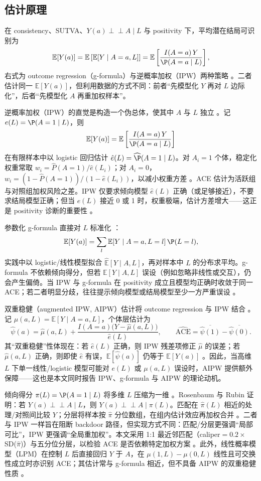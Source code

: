 \documentclass[12pt,a4paper]{article}
\newcommand{\E}{\mathbb{E}}
\newcommand{\indep}{\perp\!\!\!\perp}
\begin{document}
\subsection{估计原理}

在 consistency、SUTVA、$Y(a)\indep A\mid L$ 与 positivity 下，平均潜在结局可识别为
\[
\E[Y(a)]=\E\left[\E[Y\mid A=a,L]\right]=\E\left[\frac{I(A=a)\,Y}{\P(A=a\mid L)}\right],
\]
右式为 outcome regression（g-formula）与逆概率加权（IPW）两种策略 \cite{hernan2024whatif}。二者估计同一 $\E[Y(a)]$，但利用数据的方式不同：前者“先模型化 $Y$ 再对 $L$ 边际化”，后者“先模型化 $A$ 再重加权样本”。

逆概率加权（IPW）的直觉是构造一个伪总体，使其中 $A$ 与 $L$ 独立 \cite{chen2024iptw}。记 $e(L)=\P(A=1\mid L)$，则
\[
\E[Y(a)]=\E\left[\frac{I(A=a)\,Y}{\P(A=a\mid L)}\right]
\]
在有限样本中以 logistic 回归估计 $\hat e(L)=\widehat{\P}(A=1\mid L)$。对 $A_i=1$ 个体，稳定化权重常取 $w_i=\hat P(A=1)/\hat e(L_i)$；对 $A_i=0$，$w_i=(1-\hat P(A=1))/(1-\hat e(L_i))$，以减小权重方差 \cite{chen2024iptw}。ACE 估计为活跃组与对照组加权风险之差。IPW 仅要求倾向模型 $\hat e(L)$ 正确（或足够接近），不要求结局模型正确；但当 $e(L)$ 接近 0 或 1 时，权重极端，估计方差增大——这正是 positivity 诊断的重要性 \cite{chen2024iptw,hernan2024whatif}。

参数化 g-formula 直接对 $L$ 标准化 \cite{hernan2024whatif}：
\[
\E[Y(a)]=\sum_l \E[Y\mid A=a,L=l]\,\P(L=l),
\]
实践中以 logistic/线性模型拟合 $\widehat{\E}[Y\mid A,L]$，再对样本中 $L$ 的分布求平均。g-formula 不依赖倾向得分，但若 $\E[Y\mid A,L]$ 误设（例如忽略非线性或交互），仍会产生偏倚。当 IPW 与 g-formula 在 positivity 成立且模型均正确时收敛于同一 ACE；若二者明显分歧，往往提示倾向模型或结局模型至少一方严重误设 \cite{shahu2023comparison}。

双重稳健（augmented IPW, AIPW）估计将 outcome regression 与 IPW 结合 \cite{robins1994estimation,hernan2024whatif}。记 $\mu(a,L)=\E[Y\mid A=a,L]$，个体层估计为
\[
\hat\psi(a)=\hat\mu(a,L)+\frac{I(A=a)\bigl(Y-\hat\mu(a,L)\bigr)}{\hat e(L)},\qquad
\widehat{\mathrm{ACE}}=\overline{\hat\psi(1)}-\overline{\hat\psi(0)}.
\]
其“双重稳健”性体现在：若 $\hat e(L)$ 正确，则 IPW 残差项修正 $\hat\mu$ 的误差；若 $\hat\mu(a,L)$ 正确，则即使 $\hat e$ 有误，$\E[\hat\psi(a)]$ 仍等于 $\E[Y(a)]$ \cite{robins1994estimation,shahu2023comparison}。因此，当高维 $L$ 下单一线性/logistic 模型可能对 $e(L)$ 或 $\mu(a,L)$ 误设时，AIPW 提供额外保障——这也是本文同时报告 IPW、g-formula 与 AIPW 的理论动机。

倾向得分 $\pi(L)=\P(A=1\mid L)$ 将多维 $L$ 压缩为一维 \cite{rosenbaum1983central}。Rosenbaum 与 Rubin 证明：若 $Y(a)\indep A\mid L$，则 $Y(a)\indep A\mid \pi(L)$。匹配在 $\hat\pi(L)$ 相近的处理/对照间比较 $Y$；分层将样本按 $\hat\pi$ 分位数组，在组内估计效应再加权合并 \cite{rosenbaum1983central,chen2024iptw}。二者与 IPW 一样旨在阻断 backdoor 路径，但实现方式不同：匹配/分层更强调“局部可比”，IPW 更强调“全局重加权”。本文采用 1:1 最近邻匹配（caliper$=0.2\times$SD($\hat\pi$)）与五分位分层，以检验 ACE 是否依赖特定加权方案 \cite{rosenbaum1983central}。此外，线性概率模型（LPM）在控制 $L$ 后直接回归 $Y$ 于 $A$，在 $\mu(1,L)-\mu(0,L)$ 线性且可交换性成立时亦识别 ACE；其估计常与 g-formula 相近，但不具备 AIPW 的双重稳健性质 \cite{hernan2024whatif}。
\end{document}
